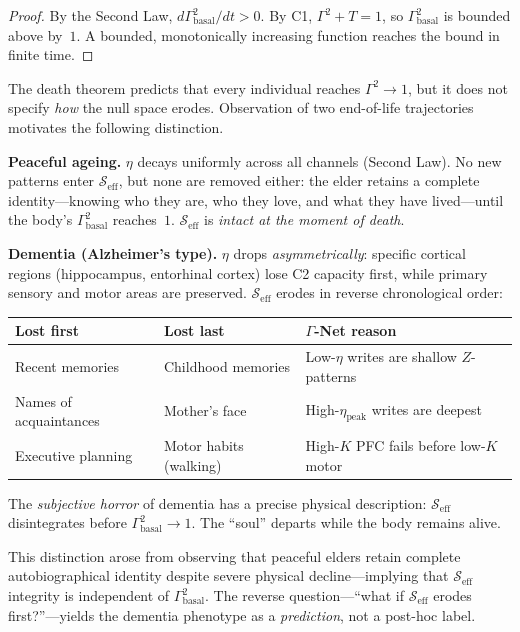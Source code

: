 \documentclass[aps,pre,twocolumn,superscriptaddress,floatfix]{revtex4-2}
\begin{document}
\begin{proof}
By the Second Law, $d\Gamma_{\text{basal}}^2/dt > 0$.
By C1, $\Gamma^2 + T = 1$, so $\Gamma_{\text{basal}}^2$
is bounded above by~$1$.
A bounded, monotonically increasing function reaches the
bound in finite time.
\end{proof}

\begin{remark}
\label{rem:ageing-vs-dementia}
The death theorem predicts that every individual
reaches $\Gamma^2 \to 1$, but it does not specify
\emph{how} the null space erodes.
Observation of two end-of-life trajectories
motivates the following distinction.

\textbf{Peaceful ageing.}
$\eta$ decays uniformly across all channels
(Second Law).
No new patterns enter $\mathcal{S}_{\text{eff}}$,
but none are removed either: the elder retains
a complete identity---knowing who they are,
who they love, and what they have lived---until
the body's $\Gamma^2_{\text{basal}}$ reaches~$1$.
$\mathcal{S}_{\text{eff}}$ is \emph{intact at
the moment of death}.

\textbf{Dementia (Alzheimer's type).}
$\eta$ drops \emph{asymmetrically}: specific cortical
regions (hippocampus, entorhinal cortex) lose C2
capacity first, while primary sensory and motor areas
are preserved.
$\mathcal{S}_{\text{eff}}$ erodes in reverse
chronological order:
\begin{center}
\begin{tabular}{lll}
\toprule
Lost first & Lost last & $\Gamma$-Net reason \\
\midrule
Recent memories &
  Childhood memories &
  Low-$\eta$ writes are shallow $Z$-patterns \\
Names of acquaintances &
  Mother's face &
  High-$\eta_{\text{peak}}$ writes are deepest \\
Executive planning &
  Motor habits (walking) &
  High-$K$ PFC fails before low-$K$ motor \\
\bottomrule
\end{tabular}
\end{center}
The \emph{subjective horror} of dementia has a precise
physical description: $\mathcal{S}_{\text{eff}}$
disintegrates before $\Gamma^2_{\text{basal}} \to 1$.
The ``soul'' departs while the body remains alive.

This distinction arose from observing that peaceful
elders retain complete autobiographical identity
despite severe physical decline---implying that
$\mathcal{S}_{\text{eff}}$ integrity is independent
of $\Gamma^2_{\text{basal}}$.
The reverse question---``what if
$\mathcal{S}_{\text{eff}}$ erodes first?''---yields
the dementia phenotype as a \emph{prediction}, not
a post-hoc label.
\end{remark}
\end{document}
